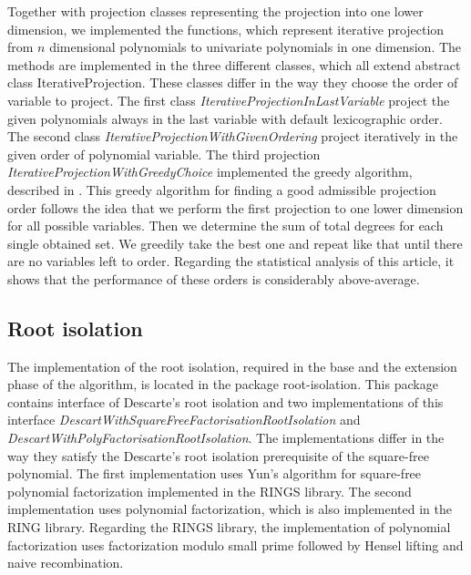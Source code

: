 \documentclass[
  digital, %
  twoside, %
  table,   %
  nolof,     %
  nolot,     %
]{fithesis3}
\begin{document}
Together with projection classes representing the projection into one lower dimension, we implemented the functions, which represent iterative projection from $n$ dimensional polynomials to univariate polynomials in one dimension. The methods are implemented in the three different classes, which all extend abstract class IterativeProjection. These classes differ in the way they choose the order of variable to project. 
The first class \textit{IterativeProjectionInLastVariable} project the given polynomials always in the last variable with default lexicographic order.
The second class \textit{IterativeProjectionWithGivenOrdering} project iteratively in the given order of polynomial variable.
The third projection \textit{IterativeProjectionWithGreedyChoice} implemented the greedy algorithm, described in . This greedy algorithm for finding a good admissible projection order follows the idea that we perform the first projection to one lower dimension for all possible variables. Then we determine the sum of total degrees for each single obtained set. We greedily take the best one and repeat like that until there are no variables left to order. Regarding the statistical analysis of this article, it shows that the performance of these orders is
considerably above-average. \parencite{Dolzmann:2004:EPO:1005285.1005303}


\subsection{Root isolation}
The implementation of the root isolation, required in the base and the extension phase of the algorithm, is located in the package root-isolation. This package contains interface of Descarte's root isolation and two implementations of this interface \textit{DescartWithSquareFreeFactorisationRootIsolation} and  \textit{DescartWithPolyFactorisationRootIsolation}.
The implementations differ in the way they satisfy the Descarte's root isolation prerequisite of the square-free polynomial. 
The first implementation uses Yun's algorithm for square-free polynomial factorization implemented in the RINGS library.
The second implementation uses polynomial factorization, which is also implemented in the RING library. Regarding the RINGS library, the implementation of polynomial factorization uses factorization modulo small prime followed by Hensel lifting and naive recombination.
\end{document}
